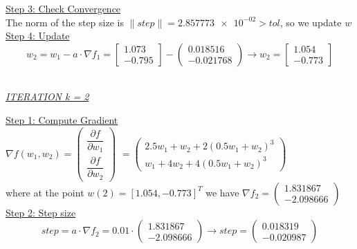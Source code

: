 \underline{Step 3: Check Convergence}\\
The norm of the step size is $\| step \| = \num{2.857773e-02 }> tol$, so we update $w$
\\[4mm]

\underline{Step 4: Update}
\[ 
w_2 = w_1 - a\cdot \nabla f_1 =  \left[\begin{array}{c}
 1.073\\
-0.795
\end{array}\right] - \left(\begin{array}{c}
	0.018516 \\
	-0.021768
\end{array}\right) \rightarrow
w_2 = \left[\begin{array}{c}
	1.054\\
	-0.773
\end{array}\right]
\]
\\[4mm]

\begin{center}
	\underline{\textit{ITERATION k = 2}}
\end{center}

\underline{Step 1: Compute Gradient}\\
\(\nabla f(w_1,w_2) = \left(\begin{array}{c}
	\dfrac{\partial f}{\partial w_1} \\[4mm]
	\dfrac{\partial f}{\partial w_2}
\end{array}\right)\) $= \left(\begin{array}{c}
	2.5w_1 + w_2 + 2(0.5w_1+w_2)^3\\[1mm]
	w_1 + 4w_2 + 4(0.5w_1+w_2)^3
\end{array}\right)$ \\[3mm]

where at the point $w\left(2\right) = \left[1.054, -0.773\right]^T$ we have $\nabla f_{2} = \left(\begin{array}{c}
	1.831867 \\
	-2.098666
\end{array}\right)$
\\[4mm]

\underline{Step 2: Step size}
\[
step = a \cdot \nabla f_{2} = 0.01 \cdot \left(\begin{array}{c}
	1.831867 \\
   -2.098666
\end{array}\right) \rightarrow step =\left(\begin{array}{c}
	0.018319 \\
	-0.020987
\end{array}\right)
\]
\\[4mm]

